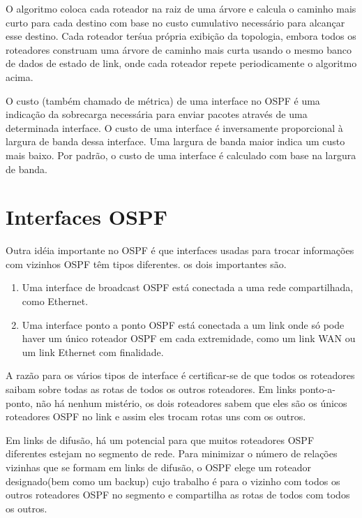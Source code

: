 \documentclass[12pt,a4paper]{report}
\begin{document}
O algoritmo coloca cada roteador na raiz de uma \'arvore e calcula o caminho mais curto para cada destino com base no custo cumulativo necess\'ario para alcançar esse destino. Cada roteador ter\' sua pr\'opria exibi\c{c}\~ao da topologia, embora todos os roteadores construam uma \'arvore de caminho mais curta usando o mesmo banco de dados de estado de link, onde cada roteador repete periodicamente o algoritmo acima. 

O custo (tamb\'em chamado de m\'etrica) de uma interface no OSPF \'e uma indica\c{c}\~ao da sobrecarga necess\'aria para enviar pacotes atrav\'es de uma determinada interface. O custo de uma interface \'e inversamente proporcional \`a largura de banda dessa interface. Uma largura de banda maior indica um custo mais baixo. Por padr\~ao, o custo de uma interface \'e calculado com base na largura de banda.

\section{Interfaces OSPF}

Outra id\'eia importante no OSPF \'e que interfaces usadas para trocar informa\c{c}\~oes com vizinhos OSPF t\^em tipos diferentes. os dois importantes s\~ao.
\begin{enumerate}
\item Uma interface de broadcast OSPF est\'a conectada a uma rede compartilhada, como Ethernet.
\item Uma interface ponto a ponto OSPF est\'a conectada a um link onde s\'o pode haver um \'unico roteador OSPF em cada extremidade, como um link WAN ou um link Ethernet com finalidade.
\end{enumerate}

A raz\~ao para os v\'arios tipos de interface \'e certificar-se de que todos os roteadores saibam sobre todas as rotas de todos os outros roteadores. Em links ponto-a-ponto, n\~ao h\'a nenhum mist\'erio, os dois roteadores sabem que eles s\~ao os \'unicos roteadores OSPF no link e assim eles trocam rotas uns com os outros.

Em links de difus\~ao, h\'a um potencial para que muitos roteadores OSPF diferentes estejam no segmento de rede. Para minimizar o n\'umero de rela\c{c}\~oes vizinhas que se formam em links de difus\~ao, o OSPF elege um roteador designado(bem como um backup) cujo trabalho \'e para o vizinho com todos os outros roteadores OSPF no segmento e compartilha as rotas de todos com todos os outros.
\end{document}
